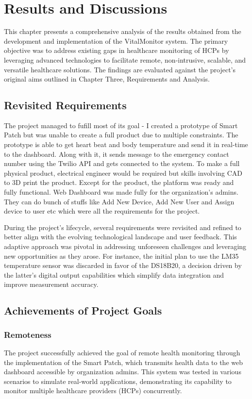 \chapter{Results and Discussions}

This chapter presents a comprehensive analysis of the results obtained from the development and implementation of the VitalMonitor system. The primary objective was to address existing gaps in healthcare monitoring of HCPs by leveraging advanced technologies to facilitate remote, non-intrusive, scalable, and versatile healthcare solutions. The findings are evaluated against the project's original aims outlined in Chapter Three, Requirements and Analysis.

\section{Revisited Requirements}
The project managed to fufill most of its goal - I created a prototype of Smart Patch but was unable to create a full product due to multiple constraints. The prototype is able to get heart beat and body temperature and send it in real-time to the dashboard. Along with it, it sends message to the emergency contact number using the Twilio API and gets connected to the system.  To make a full physical product, electrical engineer would be required but skills involving CAD to 3D print the product. Except for the product, the platform was ready and fully functional. Web Dashboard was made fully for the organization's admins. They can do bunch of stuffs like Add New Device, Add New User and Assign device to user etc which were all the requirements for the project.

During the project's lifecycle, several requirements were revisited and refined to better align with the evolving technological landscape and user feedback. This adaptive approach was pivotal in addressing unforeseen challenges and leveraging new opportunities as they arose. For instance, the initial plan to use the LM35 temperature sensor was discarded in favor of the DS18B20, a decision driven by the latter's digital output capabilities which simplify data integration and improve measurement accuracy.

\section{Achievements of Project Goals}
\subsection{Remoteness}
The project successfully achieved the goal of remote health monitoring through the implementation of the Smart Patch, which transmits health data to the web dashboard accessible by organization admins. This system was tested in various scenarios to simulate real-world applications, demonstrating its capability to monitor multiple healthcare providers (HCPs) concurrently. 

